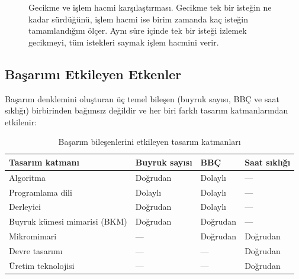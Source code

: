 \begin{figure}[H]
\caption[Gecikme ve işlem hacmi karşılaştırması]{Gecikme ve işlem hacmi karşılaştırması. Gecikme tek bir isteğin ne kadar sürdüğünü, işlem hacmi ise birim zamanda kaç isteğin tamamlandığını ölçer. Aynı süre içinde tek bir isteği izlemek gecikmeyi, tüm istekleri saymak işlem hacmini verir.}
\label{fig:gecikme-islemhacmi}
\end{figure}


\subsection{Başarımı Etkileyen Etkenler}
\label{subsec:basarim-faktorleri}

Başarım denklemini oluşturan üç temel bileşen (buyruk sayısı, BBÇ ve saat sıklığı) birbirinden bağımsız değildir ve her biri farklı tasarım katmanlarından etkilenir:

\begin{table}[H]
\centering
\caption{Başarım bileşenlerini etkileyen tasarım katmanları}
\label{tab:basarim-etki}
\small
\begin{tabular}{lp{3.2cm}p{3.2cm}p{3.2cm}}
\toprule
\textbf{Tasarım katmanı} & \textbf{Buyruk sayısı} & \textbf{BBÇ} & \textbf{Saat sıklığı} \\
\midrule
Algoritma      & Doğrudan   & Dolaylı    & ---         \\
Programlama dili & Dolaylı & Dolaylı    & ---         \\
Derleyici      & Doğrudan   & Dolaylı    & ---         \\
Buyruk kümesi mimarisi (BKM) & Doğrudan & Doğrudan & ---         \\
Mikromimari    & ---        & Doğrudan   & Doğrudan    \\
Devre tasarımı & ---        & ---        & Doğrudan    \\
Üretim teknolojisi & ---   & ---        & Doğrudan    \\
\bottomrule
\end{tabular}
\end{table}


